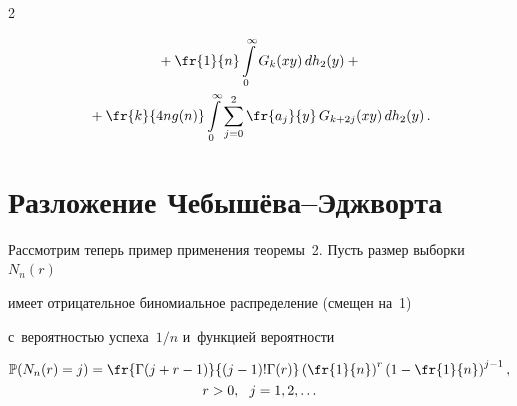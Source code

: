 \begin{multicols}{2}
\noindent


\begin{multline}


\label{gn2n}


{}+  \fr{1}{n}\int\limits^{\infty}_{0} G_k(xy) \,dh_2(y) + {}\\


{}+


\fr{k}{4ng(n)} \int\limits_{0}^\infty \sum\limits_{j=0}^{2}\fr{a_j}{y}\,G_{k+2j}(xy)\,dh_2(y)\,.


\end{multline}





\vspace*{-6pt}





\section{Разложение Чебышёва--Эджворта}







Рассмотрим теперь пример применения тео\-ре\-мы~2. Пусть размер выборки~$N_n(r)$ 


имеет отрицательное биномиальное распределение (смещен на~1) 


с~вероятностью успеха~$1/n$ и~функцией вероятности





\vspace*{-6pt}





\noindent


\begin{multline}


\label{eq5}


\mathbb{P}(N_n(r)=j)= \fr{\Gamma(j+r-1)}{(j-1)!\Gamma(r)}\left(\fr{1}{n} \right)^{r}


\left( 1 - \fr{1}{n} \right)^{j-1}, \\


 r>0, \ \ j =1, 2, 


\ldots


\end{multline}






\end{multicols}
